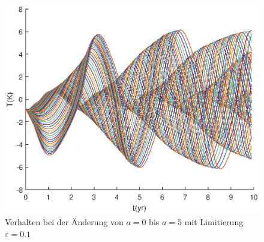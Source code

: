 \begin{figure}
	\centering
	\includegraphics{verzoegert/inp/figures/param_a_e01.eps}
	\caption{Verhalten bei der Änderung von $a=0$ bis $a=5$ mit Limitierung $\varepsilon = 0.1$}
	\label{fig:chaos_fix}
\end{figure}
